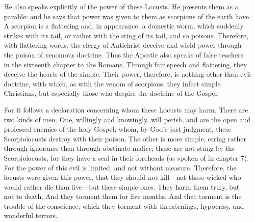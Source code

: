 He also speaks explicitly of the power of these Locusts. He presents them as a parable: and he says that power was given to them as scorpions of the earth have. A scorpion is a flattering and, in appearance, a domestic worm, which suddenly strikes with its tail, or rather with the sting of its tail, and so poisons. Therefore, with flattering words, the clergy of Antichrist deceive and wield power through the poison of venomous doctrine. Thus the Apostle also speaks of false teachers in the sixteenth chapter to the Romans. Through fair speech and flattering, they deceive the hearts of the simple. Their power, therefore, is nothing other than evil doctrine, with which, as with the venom of scorpions, they infect simple Christians, but especially those who despise the doctrine of the Gospel.

For it follows a declaration concerning whom these Locusts may harm. There are two kinds of men. One, willingly and knowingly, will perish, and are the open and professed enemies of the holy Gospel; whom, by God’s just judgment, these Scorpiolocusts destroy with their poison. The other is more simple, erring rather through ignorance than through obstinate malice; these are not stung by the Scorpiolocusts, for they have a seal in their foreheads (as spoken of in chapter 7). For the power of this evil is limited, and not without measure. Therefore, the locusts were given this power, that they should not kill—not those wicked who would rather die than live—but these simple ones. They harm them truly, but not to death. And they torment them for five months. And that torment is the trouble of the conscience, which they torment with threatenings, hypocrisy, and wonderful terrors.

